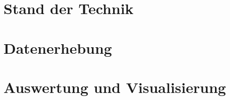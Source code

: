 
\section{Stand der Technik}
\textit{\lipsum[1]}

\section{Datenerhebung}
\textit{\lipsum[1]}

\section{Auswertung und Visualisierung}
\textit{\lipsum[1]}